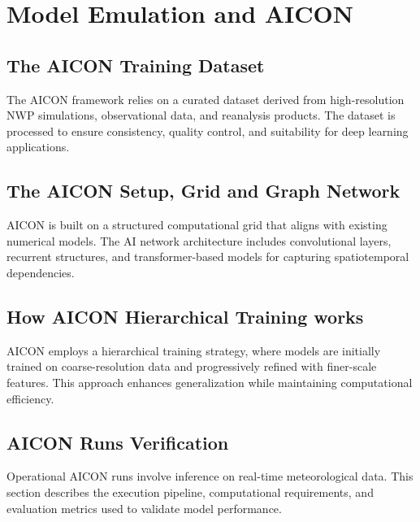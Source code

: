 \chapter{Model Emulation and AICON}

\section{The AICON Training Dataset}
The AICON framework relies on a curated dataset derived from high-resolution NWP simulations, observational data, and reanalysis products. The dataset is processed to ensure consistency, quality control, and suitability for deep learning applications.

\section{The AICON Setup, Grid and Graph Network}
AICON is built on a structured computational grid that aligns with existing numerical models. The AI network architecture includes convolutional layers, recurrent structures, and transformer-based models for capturing spatiotemporal dependencies.

\section{How AICON Hierarchical Training works}
AICON employs a hierarchical training strategy, where models are initially trained on coarse-resolution data and progressively refined with finer-scale features. This approach enhances generalization while maintaining computational efficiency.

\section{AICON Runs Verification}
Operational AICON runs involve inference on real-time meteorological data. This section describes the execution pipeline, computational requirements, and evaluation metrics used to validate model performance.
